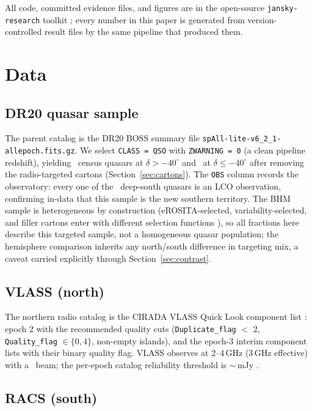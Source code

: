 \documentclass[twocolumn]{aastex631}
\newcommand{\code}[1]{\texttt{#1}}
\begin{document}
All code, committed evidence files, and figures are in the open-source
\code{jansky-research} toolkit \citep{janskyresearch}; every number in this paper is
generated from version-controlled result files by the same pipeline that produced them.

\section{Data}

\subsection{DR20 quasar sample}

The parent catalog is the DR20 BOSS summary file
\code{spAll-lite-v6\_2\_1-allepoch.fits.gz}. We select \code{CLASS = QSO} with
\code{ZWARNING = 0} (a clean pipeline redshift), yielding \drNorthCensus\ census quasars at
$\delta > -40^\circ$ and \drSouthCensus\ at $\delta \le -40^\circ$ after removing the
radio-targeted cartons (Section~\ref{sec:cartons}). The \code{OBS} column records the
observatory: every one of the \drSouthCensus\ deep-south quasars is an LCO observation,
confirming in-data that this sample is the new southern territory. The BHM sample is
heterogeneous by construction (eROSITA-selected, variability-selected, and filler
cartons enter with different selection functions \citep{dr20}), so all fractions here
describe this targeted sample, not a homogeneous quasar population; the
hemisphere comparison inherits any north/south difference in targeting mix, a caveat
carried explicitly through Section~\ref{sec:contrast}.

\subsection{VLASS (north)}

The northern radio catalog is the CIRADA VLASS Quick Look component list
\citep{gordon2021}: epoch 2 with the recommended quality cuts (\code{Duplicate\_flag} $<$
2, \code{Quality\_flag} $\in \{0,4\}$, non-empty islands), and the epoch-3 interim
component lists with their binary quality flag. VLASS observes at 2--4\,GHz (3\,GHz
effective) with a \drAlphaVlassBeam\arcsec\ beam; the per-epoch catalog reliability threshold is
$\sim$\drSlimVlass\,mJy \citep{gordon2021}.

\subsection{RACS (south)}
\end{document}

